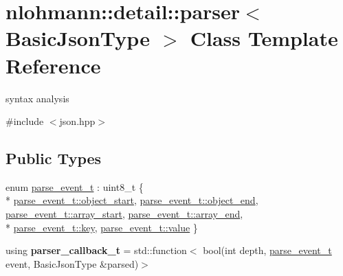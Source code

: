 \hypertarget{classnlohmann_1_1detail_1_1parser}{}\section{nlohmann\+:\+:detail\+:\+:parser$<$ Basic\+Json\+Type $>$ Class Template Reference}
\label{classnlohmann_1_1detail_1_1parser}


syntax analysis  




{\ttfamily \#include $<$json.\+hpp$>$}

\subsection*{Public Types}
\begin{DoxyCompactItemize}
\item 
enum \hyperlink{classnlohmann_1_1detail_1_1parser_a37ac88c864dda495f72cb62776b0bebe}{parse\+\_\+event\+\_\+t} \+: uint8\+\_\+t \{ \\*
\hyperlink{classnlohmann_1_1detail_1_1parser_a37ac88c864dda495f72cb62776b0bebeae73f17027cb0acbb537f29d0a6944b26}{parse\+\_\+event\+\_\+t\+::object\+\_\+start}, 
\hyperlink{classnlohmann_1_1detail_1_1parser_a37ac88c864dda495f72cb62776b0bebeaf63e2a2468a37aa4f394fcc3bcb8249c}{parse\+\_\+event\+\_\+t\+::object\+\_\+end}, 
\hyperlink{classnlohmann_1_1detail_1_1parser_a37ac88c864dda495f72cb62776b0bebeaa4388a3d92419edbb1c6efd4d52461f3}{parse\+\_\+event\+\_\+t\+::array\+\_\+start}, 
\hyperlink{classnlohmann_1_1detail_1_1parser_a37ac88c864dda495f72cb62776b0bebea49642fb732aa2e112188fba1f9d3ef7f}{parse\+\_\+event\+\_\+t\+::array\+\_\+end}, 
\\*
\hyperlink{classnlohmann_1_1detail_1_1parser_a37ac88c864dda495f72cb62776b0bebea3c6e0b8a9c15224a8228b9a98ca1531d}{parse\+\_\+event\+\_\+t\+::key}, 
\hyperlink{classnlohmann_1_1detail_1_1parser_a37ac88c864dda495f72cb62776b0bebea2063c1608d6e0baf80249c42e2be5804}{parse\+\_\+event\+\_\+t\+::value}
 \}
\item 
using {\bfseries parser\+\_\+callback\+\_\+t} = std\+::function$<$ bool(int depth, \hyperlink{classnlohmann_1_1detail_1_1parser_a37ac88c864dda495f72cb62776b0bebe}{parse\+\_\+event\+\_\+t} event, Basic\+Json\+Type \&parsed)$>$\hypertarget{classnlohmann_1_1detail_1_1parser_ad250ad4f2b4af4a497e727c963162ff1}{}\label{classnlohmann_1_1detail_1_1parser_ad250ad4f2b4af4a497e727c963162ff1}

\end{DoxyCompactItemize}

